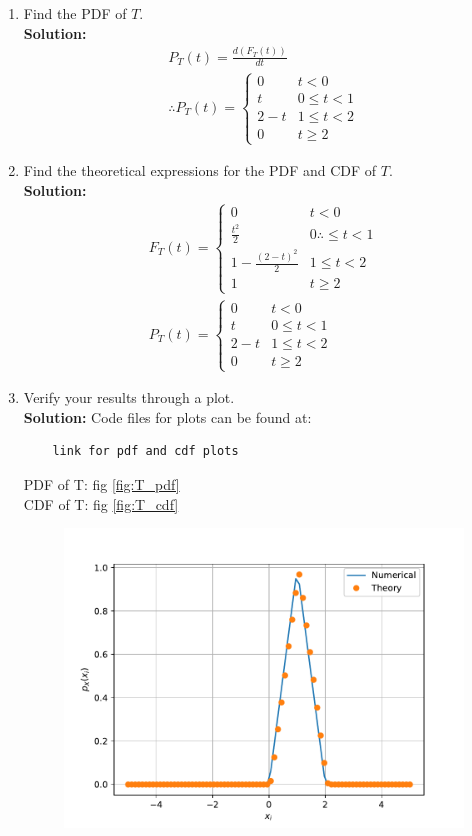 \documentclass[journal,12pt,twocolumn]{IEEEtran}
\renewcommand\thesection{\arabic{section}}
\theoremstyle{remark}
\newcommand{\solution}{\noindent \textbf{Solution: }}
\numberwithin{equation}{section}
\begin{document}
\begin{enumerate}[label=\thesection.\arabic*
,ref=\thesection.\theenumi]
\item Find the PDF of $T$. \\
\solution 
\begin{align}
	P_T(t) = \frac{d(F_T(t))}{dt} \\
	\therefore P_T(t) = 
	\begin{cases}
		0 & t < 0 \\
		t &  0 \leq t < 1 \\
		2-t & 1 \leq t < 2 \\
		0  & t \geq 2
	\end{cases}
\end{align}
\item Find the theoretical expressions for the PDF and CDF of $T$. \\
\solution 
\begin{align}
	F_T(t) =  
	 \begin{cases}
		0 & t<0 \\
		\frac{t^2}{2} & 0 \therefore \leq t < 1 \\
		1 - \frac{(2-t)^2}{2} & 1 \leq t < 2 \\
		1 & t \geq 2
	 \end{cases} \\
	 P_T(t) = 
	 \begin{cases}
		 0 & t < 0 \\
		 t &  0 \leq t < 1 \\
		 2-t & 1 \leq t < 2 \\
		 0  & t \geq 2
	 \end{cases}
\end{align}
\item Verify your results through a plot. \\
\solution 
Code files for plots can be found at:
\begin{lstlisting}
	link for pdf and cdf plots
\end{lstlisting}
PDF of T: fig \ref*{fig:T_pdf} \\
CDF of T: fig \ref*{fig:T_cdf}
\begin{figure}[h]
	\centering
	\includegraphics[width=\columnwidth]{figs/4/T_pdf.pdf}

\end{figure}
\end{enumerate}
\end{document}
